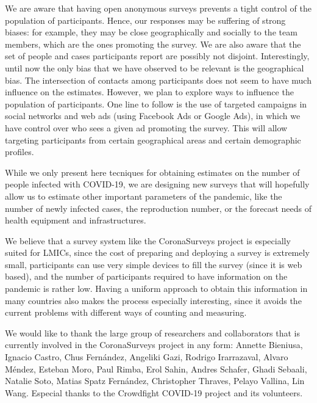 \documentclass[sigconf,authordraft]{acmart}
\begin{document}
We are aware that having open anonymous surveys prevents a tight control of the population of participants. Hence, our responses may be suffering of strong biases: for example, they may be close geographically and socially to the team members, which are the ones promoting the survey. We are also aware that the set of people and cases participants report are possibly not disjoint. Interestingly, until now the only bias that we have observed to be relevant is the geographical bias. The intersection of contacts among participants does not seem to have much influence on the estimates.
%
However, we plan to explore ways to influence the population of participants. One line to follow is the use of targeted campaigns in social networks and web ads (using Facebook Ads or Google Ads), in which we have control over who sees a given ad promoting the survey. This will allow targeting participants from certain geographical areas and certain demographic profiles.

While we only present here tecniques for obtaining estimates on the number of people infected with COVID-19, we are designing new surveys that will hopefully allow us to estimate other important parameters of the pandemic, like the number of newly infected cases, the reproduction number, or the forecast needs of health equipment and infrastructures.

We believe that a survey system like the CoronaSurveys project is especially suited for LMICs, since the cost of preparing and deploying a survey is extremely small, participants can use very simple devices to fill the survey (since it is web based), and the number of participants required to have information on the pandemic is rather low. Having a uniform approach to obtain this information in many countries also makes the process especially interesting, since it avoids the current problems with different ways of counting and measuring. 


\begin{acks}
We would like to thank the large group of researchers and collaborators that is currently involved in the CoronaSurveys project in any form: 
Annette Bieniusa,
Ignacio Castro, 
Chus Fernández,
Angeliki Gazi, 
Rodrigo Irarrazaval,
Alvaro Méndez,
Esteban Moro,
Paul Rimba,
Erol Sahin,
Andres Schafer,
Ghadi Sebaali,
Natalie Soto,
Matias Spatz Fernández,
Christopher Thraves, 
Pelayo Vallina, 
Lin Wang. Especial thanks to the Crowdfight COVID-19 project \cite{crowdfight} and its volunteers.
\end{acks}



%
%





\end{document}
